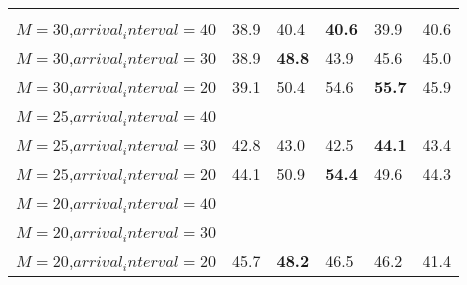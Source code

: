 \begin{tabular}{l  | l l l l l }
& \multicolumn{5}{c}{} \\
$M=30$,$arrival_interval=40$ & 38.9 & 40.4 & \textbf{40.6} & 39.9 & 40.6 \\
$M=30$,$arrival_interval=30$ & 38.9 & \textbf{48.8} & 43.9 & 45.6 & 45.0 \\
$M=30$,$arrival_interval=20$ & 39.1 & 50.4 & 54.6 & \textbf{55.7} & 45.9 \\
$M=25$,$arrival_interval=40$ &  &  &  &  &  \\
$M=25$,$arrival_interval=30$ & 42.8 & 43.0 & 42.5 & \textbf{44.1} & 43.4 \\
$M=25$,$arrival_interval=20$ & 44.1 & 50.9 & \textbf{54.4} & 49.6 & 44.3 \\
$M=20$,$arrival_interval=40$ &  &  &  &  &  \\
$M=20$,$arrival_interval=30$ &  &  &  &  &  \\
$M=20$,$arrival_interval=20$ & 45.7 & \textbf{48.2} & 46.5 & 46.2 & 41.4
\end{tabular}
